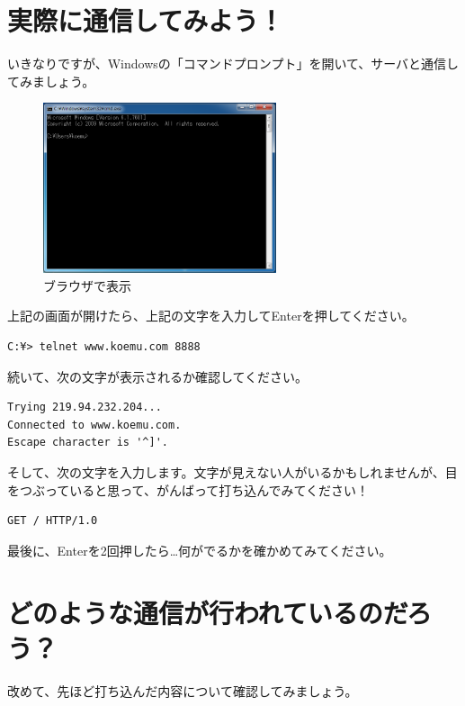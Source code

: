 \documentclass[a4j,11pt,openany]{jsbook}
\begin{document}
\section{実際に通信してみよう！}

いきなりですが、Windowsの「コマンドプロンプト」を開いて、サーバと通信してみましょう。

\begin{figure}[H]
    \begin{center}
        \includegraphics[height=5cm]{./cmd.png}
        \caption{ブラウザで表示}
        \label{browser}
    \end{center}
\end{figure}

上記の画面が開けたら、上記の文字を入力してEnterを押してください。

\begin{lstlisting}
C:¥> telnet www.koemu.com 8888
\end{lstlisting}    

続いて、次の文字が表示されるか確認してください。

\begin{lstlisting}
Trying 219.94.232.204...
Connected to www.koemu.com.
Escape character is '^]'.
\end{lstlisting}

そして、次の文字を入力します。文字が見えない人がいるかもしれませんが、目をつぶっていると思って、がんばって打ち込んでみてください！

\begin{lstlisting}
GET / HTTP/1.0
\end{lstlisting}

最後に、Enterを2回押したら…何がでるかを確かめてみてください。

\section{どのような通信が行われているのだろう？}

改めて、先ほど打ち込んだ内容について確認してみましょう。
\end{document}
